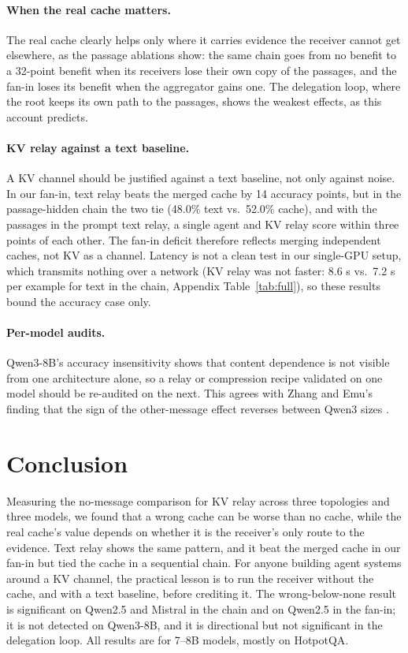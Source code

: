 \documentclass[11pt]{article}
\begin{document}
\paragraph{When the real cache matters.} The real cache clearly helps
only where it carries evidence the receiver cannot get elsewhere, as the
passage ablations show: the same chain goes from no benefit to a 32-point benefit
when its receivers lose their own copy of the passages, and the fan-in loses its
benefit when the aggregator gains one. The delegation loop, where
the root keeps its own path to the passages, shows the weakest effects, as this
account predicts.

\paragraph{KV relay against a text baseline.} A KV channel should be
justified against a text baseline, not only against noise. In our fan-in, text
relay beats the merged cache by 14 accuracy points, but in the passage-hidden chain
the two tie (48.0\% text vs.\ 52.0\% cache), and with the passages in the prompt
text relay, a single agent and KV relay score within three points of each other.
The fan-in deficit therefore reflects merging independent caches, not KV as a
channel. Latency is
not a clean test in our single-GPU setup, which transmits nothing over a network
(KV relay was not faster: 8.6 s vs.\ 7.2 s per example for text in the chain,
Appendix Table~\ref{tab:full}), so these results bound the accuracy case only.

\paragraph{Per-model audits.} Qwen3-8B's accuracy insensitivity shows that content
dependence is not visible from one architecture alone, so a relay or
compression recipe validated on one model should be re-audited on the
next. This agrees with Zhang and Emu's finding that the sign of the
other-message effect reverses between Qwen3 sizes \citep{zhangemu2026}.

\section{Conclusion}

Measuring the no-message comparison for KV relay across three topologies and
three models, we found that a wrong cache can be worse than no cache,
while the real cache's value depends on whether it is the receiver's only route
to the evidence. Text relay shows the same pattern, and it beat the merged cache
in our fan-in but tied the cache in a sequential chain. For
anyone building agent systems around a KV channel, the practical lesson is to
run the receiver without the cache, and with a text baseline, before crediting it.
The wrong-below-none result is significant on Qwen2.5 and Mistral in the chain
and on Qwen2.5 in the fan-in; it is not detected on Qwen3-8B, and it is
directional but not significant in the delegation loop. All results are for
7--8B models, mostly on HotpotQA.
\end{document}

